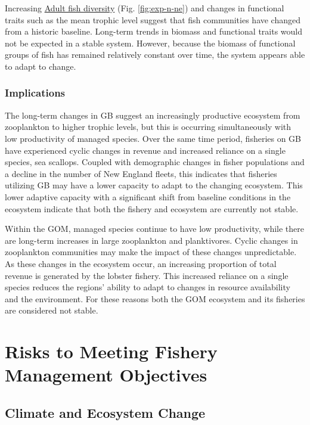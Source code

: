 \documentclass[
  10pt,
]{article}
\begin{document}
\newpage

Increasing \href{https://noaa-edab.github.io/catalog/exp_n.html}{Adult fish diversity} (Fig. \ref{fig:exp-n-ne}) and changes in functional traits such as the mean trophic level suggest that fish communities have changed from a historic baseline. Long-term trends in biomass and functional traits would not be expected in a stable system. However, because the biomass of functional groups of fish has remained relatively constant over time, the system appears able to adapt to change.

\subsubsection{Implications}\label{implications-5}

The long-term changes in GB suggest an increasingly productive ecosystem from zooplankton to higher trophic levels, but this is occurring simultaneously with low productivity of managed species. Over the same time period, fisheries on GB have experienced cyclic changes in revenue and increased reliance on a single species, sea scallops. Coupled with demographic changes in fisher populations and a decline in the number of New England fleets, this indicates that fisheries utilizing GB may have a lower capacity to adapt to the changing ecosystem. This lower adaptive capacity with a significant shift from baseline conditions in the ecosystem indicate that both the fishery and ecosystem are currently not stable.

Within the GOM, managed species continue to have low productivity, while there are long-term increases in large zooplankton and planktivores. Cyclic changes in zooplankton communities may make the impact of these changes unpredictable. As these changes in the ecosystem occur, an increasing proportion of total revenue is generated by the lobster fishery. This increased reliance on a single species reduces the regions' ability to adapt to changes in resource availability and the environment. For these reasons both the GOM ecosystem and its fisheries are considered not stable.

\newpage

\section{Risks to Meeting Fishery Management Objectives}\label{risks-to-meeting-fishery-management-objectives}

\subsection{Climate and Ecosystem Change}\label{climate-and-ecosystem-change}
\end{document}
